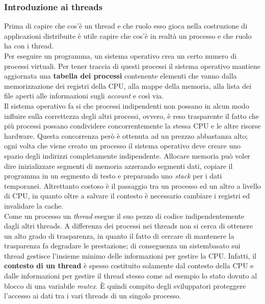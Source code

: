 \subsubsection{Introduzione ai threads}
Prima di capire che cos'è un thread e che ruolo esso gioca nella costruzione di applicazioni distribuite è utile capire che cos'è in realtà un processo e che ruolo ha con i thread.\\
Per eseguire un programma, un sistema operativo crea un certo numero di processi virtuali. Per tener traccia di questi processi il sistema operativo mantiene aggiornata una \textbf{tabella dei processi} contenente elementi che vanno dalla memorizzazione dei registri della CPU, alla mappe della memoria, alla lista dei file aperti alle informazioni sugli \emph{account} e così via.\\
Il sistema operativo fa si che processi indipendenti non possano in alcun modo influire sulla correttezza degli altri processi, ovvero, è reso trasparente il fatto che più processi possano condividere concorrentemente la stessa CPU e le altre risorse hardware. Questa concorrenza però è ottenuta ad un prezzzo abbastanza alto; ogni volta che viene creato un processo il sistema operativo deve creare uno spazio degli indirizzi completamente indipendente. Allocare memoria può voler dire inizializzare segmenti di memoria azzerando segmenti dati, copiare il programma in un segmento di testo e preparando uno \emph{stack} per i dati temporanei. Altrettanto costoso è il passaggio tra un processo ed un altro a livello di CPU, in quanto oltre a salvare il contesto è necessario cambiare i registri ed invalidare la cache.\\
Come un processo un \emph{thread} esegue il suo pezzo di codice indipendentemente dagli altri threads. A differenza dei processi nei threads non si cerca di ottenere un alto grado di trasparenza, in quanto il fatto di cercare di mantenere la trasparenza fa degradare le prestazione; di conseguenza un sistembasato sui thread gestisce l'insieme minimo delle informazioni per gestire la CPU. Infatti, il \textbf{contesto di un thread} è spesso costituito solamente dal contesto della CPU e dalle informazioni per gestire il thread stesso come ad esempio lo stato dovuto al blocco di una variabile \emph{mutex}. \uppercase{è} quindi compito degli sviluppatori proteggere l'accesso ai dati tra i vari threads di un singolo processo.
